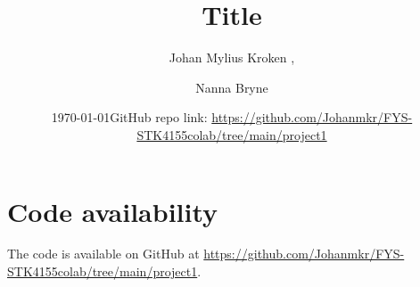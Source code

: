 






\title{Title} 

\author{Johan Mylius Kroken
,
\and
Nanna Bryne
}
\date{\today    \quad GitHub repo link: \url{https://github.com/Johanmkr/FYS-STK4155colab/tree/main/project1}}  

\maketitle




%
%


\section*{Code availability}
The code is available on GitHub at \url{https://github.com/Johanmkr/FYS-STK4155colab/tree/main/project1}.





